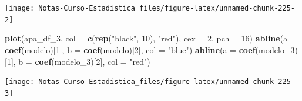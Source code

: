 \documentclass[
  12pt,
]{book}
\newenvironment{Shaded}{\begin{snugshade}}{\end{snugshade}}
\newcommand{\DataTypeTok}[1]{\textcolor[rgb]{0.13,0.29,0.53}{#1}}
\newcommand{\DecValTok}[1]{\textcolor[rgb]{0.00,0.00,0.81}{#1}}
\newcommand{\KeywordTok}[1]{\textcolor[rgb]{0.13,0.29,0.53}{\textbf{#1}}}
\newcommand{\NormalTok}[1]{#1}
\newcommand{\StringTok}[1]{\textcolor[rgb]{0.31,0.60,0.02}{#1}}
\theoremstyle{definition}
\theoremstyle{definition}
\theoremstyle{definition}
\theoremstyle{remark}
\begin{document}
\begin{center}\texttt{[image: Notas-Curso-Estadistica\_files/figure-latex/unnamed-chunk-225-2]} \end{center}

\begin{Shaded}
\begin{Highlighting}[]
\KeywordTok{plot}\NormalTok{(apa_df_}\DecValTok{3}\NormalTok{, }\DataTypeTok{col =} \KeywordTok{c}\NormalTok{(}\KeywordTok{rep}\NormalTok{(}\StringTok{"black"}\NormalTok{, }\DecValTok{10}\NormalTok{), }\StringTok{"red"}\NormalTok{), }\DataTypeTok{cex =} \DecValTok{2}\NormalTok{, }
    \DataTypeTok{pch =} \DecValTok{16}\NormalTok{)}
\KeywordTok{abline}\NormalTok{(}\DataTypeTok{a =} \KeywordTok{coef}\NormalTok{(modelo)[}\DecValTok{1}\NormalTok{], }\DataTypeTok{b =} \KeywordTok{coef}\NormalTok{(modelo)[}\DecValTok{2}\NormalTok{], }\DataTypeTok{col =} \StringTok{"blue"}\NormalTok{)}
\KeywordTok{abline}\NormalTok{(}\DataTypeTok{a =} \KeywordTok{coef}\NormalTok{(modelo_}\DecValTok{3}\NormalTok{)[}\DecValTok{1}\NormalTok{], }\DataTypeTok{b =} \KeywordTok{coef}\NormalTok{(modelo_}\DecValTok{3}\NormalTok{)[}\DecValTok{2}\NormalTok{], }
    \DataTypeTok{col =} \StringTok{"red"}\NormalTok{)}
\end{Highlighting}
\end{Shaded}

\begin{center}\texttt{[image: Notas-Curso-Estadistica\_files/figure-latex/unnamed-chunk-225-3]} \end{center}

\printbibliography
\end{document}
